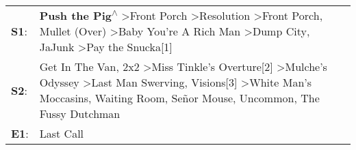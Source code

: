 \begin{supertabular}{p{0.03\textwidth}p{0.92\textwidth}}
 \textbf{S1}:  &                                                               \textbf{Push the Pig\textsuperscript{$\wedge$}} \textgreater \enspace Front Porch\textsuperscript{} \textgreater \enspace Resolution\textsuperscript{} \textgreater \enspace Front Porch\textsuperscript{}, \enspace Mullet (Over)\textsuperscript{} \textgreater \enspace Baby You're A Rich Man\textsuperscript{} \textgreater \enspace Dump City\textsuperscript{}, \enspace JaJunk\textsuperscript{} \textgreater \enspace Pay the Snucka[1]\textsuperscript{}  \enspace  \\
 \textbf{S2}:  &  Get In The Van\textsuperscript{}, \enspace 2x2\textsuperscript{} \textgreater \enspace Miss Tinkle's Overture[2]\textsuperscript{} \textgreater \enspace Mulche's Odyssey\textsuperscript{} \textgreater \enspace Last Man Swerving\textsuperscript{}, \enspace Visions[3]\textsuperscript{} \textgreater \enspace White Man's Moccasins\textsuperscript{}, \enspace Waiting Room\textsuperscript{}, \enspace Señor Mouse\textsuperscript{}, \enspace Uncommon\textsuperscript{}, \enspace The Fussy Dutchman\textsuperscript{}  \enspace  \\
 \textbf{E1}:  &                                                                                                                                                                                                                                                                                                                                                                                                                                                                                                      Last Call\textsuperscript{}  \enspace  \\
\end{supertabular}
